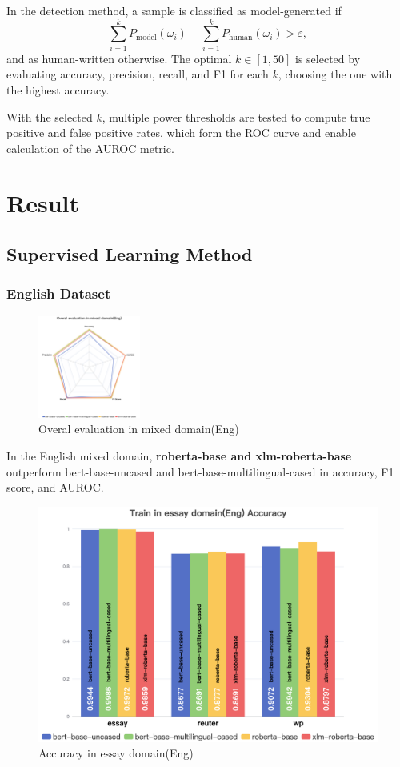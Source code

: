 \documentclass[lettersize,journal]{IEEEtran}
\begin{document}
In the detection method, a sample is classified as model-generated if
\[
\sum_{i=1}^k P_{\text{model}}(\omega_i) - \sum_{i=1}^k P_{\text{human}}(\omega_i) > \varepsilon,
\]
and as human-written otherwise. The optimal \(k \in [1,50]\) is selected by evaluating accuracy, precision, recall, and F1 for each \(k\), choosing the one with the highest accuracy.

With the selected \(k\), multiple power thresholds are tested to compute true positive and false positive rates, which form the ROC curve and enable calculation of the AUROC metric.


\section{Result}
\subsection{Supervised Learning Method}
\subsubsection{English Dataset}
\begin{figure}[H]
    \centering
\includegraphics[width=0.3\textwidth]{images/Overal evaluation in mixed domain(Eng).png}
\caption{Overal evaluation in mixed domain(Eng)}
\end{figure} 	

In the English mixed domain, \textbf{roberta-base and xlm-roberta-base} outperform bert-base-uncased and bert-base-multilingual-cased in accuracy, F1 score, and AUROC.


\begin{figure}[H]\centering
\includegraphics[width=0.6\linewidth]{images/Train in essay domain(Eng) Accuracy.png}
\caption{Accuracy in essay domain(Eng)}
    \end{figure} 	
\end{document}
